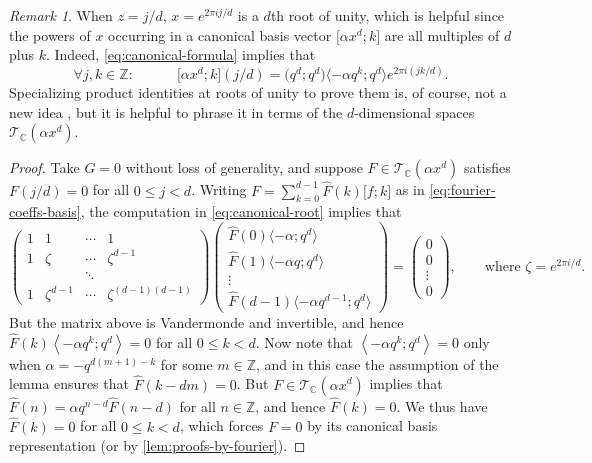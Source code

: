 \documentclass[reqno,11pt]{amsart}
\theoremstyle{definition}
\theoremstyle{remark}
\newtheorem*{remark}{Remark}
\numberwithin{equation}{section}
\newcommand{\Z}{\mathbb{Z}}
\newcommand{\C}{\mathbb{C}}
\newcommand{\mT}{\mathcal{T}}
\newcommand{\la}{\left\langle}
\newcommand{\ra}{\right\rangle}
\newcommand{\vect}[2]{\big[{#1};{#2}\big]}
\renewcommand{\hat}{\widehat}
\begin{document}
\begin{remark}
When $z = j/d$, $x = e^{2\pi i j/d}$ is a $d$th root of unity, which is helpful since the powers of $x$ occurring in a canonical basis vector $\vect{\alpha x^d}{k}$ are all multiples of $d$ plus $k$. Indeed, \cref{eq:canonical-formula} implies that
\begin{equation} \label{eq:canonical-root}
    \forall j, k \in \Z: \qquad\quad \vect{\alpha x^d}{k}\left(j/d\right) =
    \big( q^d; q^d \big) \big\langle {-\alpha} q^k; q^d \big\rangle e^{2\pi i (jk/d)}.
\end{equation}
Specializing product identities at roots of unity to prove them is, of course, not a new idea \cite{cao2012applications}, but it is helpful to phrase it in terms of the $d$-dimensional spaces $\mT_\C\left(\alpha x^d\right)$.
\end{remark}

\begin{proof}
Take $G = 0$ without loss of generality, and suppose $F \in \mT_\C\left(\alpha x^d\right)$ satisfies $F(j/d) = 0$ for all $0 \le j < d$. Writing $F = \sum_{k=0}^{d-1} \hat{F}(k) \vect{f}{k}$ as in \cref{eq:fourier-coeffs-basis}, the computation in \cref{eq:canonical-root} implies that
\[
    \begin{pmatrix}
    1 & 1 & \cdots & 1 \\
    1 & \zeta & \cdots & \zeta^{d-1} \\
    & & \ddots \\
    1 & \zeta^{d-1} & \cdots & \zeta^{(d-1)(d-1)}
    \end{pmatrix}
    \begin{pmatrix}
    \hat{F}(0) \big\langle {-\alpha}; q^d \big\rangle \\
    \hat{F}(1) \big\langle {-\alpha} q; q^d \big\rangle \\
    \vdots \\
    \hat{F}(d-1) \big\langle {-\alpha} q^{d-1}; q^d \big\rangle
    \end{pmatrix}
    =
    \begin{pmatrix}
    0 \\
    0 \\
    \vdots \\
    0
    \end{pmatrix}, \qquad \text{where } \zeta = e^{2\pi i /d}.
\]
But the matrix above is Vandermonde and invertible, and hence $\hat{F}(k) \la -\alpha q^k; q^d \ra = 0$ for all $0 \le k < d$. Now note that $\la -\alpha q^k; q^d \ra = 0$ only when $\alpha = -q^{d(m+1)-k}$ for some $m \in \Z$, and in this case the assumption of the lemma ensures that $\hat{F}(k-dm) = 0$. But $F \in \mT_\C\left(\alpha x^d\right)$ implies that $\hat{F}(n) = \alpha q^{n-d} \hat{F}(n-d)$ for all $n \in \Z$, and hence $\hat{F}(k) = 0$. We thus have $\hat{F}(k) = 0$ for all $0 \le k < d$, which forces $F = 0$ by its canonical basis representation (or by \cref{lem:proofs-by-fourier}).
\end{proof}
\end{document}
